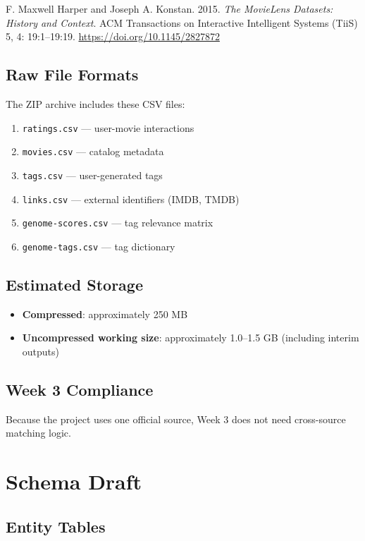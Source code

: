 \documentclass[11pt]{article}
\begin{document}
F. Maxwell Harper and Joseph A. Konstan. 2015. \emph{The MovieLens Datasets: History and Context}. ACM Transactions on Interactive Intelligent Systems (TiiS) 5, 4: 19:1--19:19. \url{https://doi.org/10.1145/2827872}

\subsection{Raw File Formats}

The ZIP archive includes these CSV files:

\begin{enumerate}[leftmargin=1.5em]
    \item \texttt{ratings.csv} --- user-movie interactions
    \item \texttt{movies.csv} --- catalog metadata
    \item \texttt{tags.csv} --- user-generated tags
    \item \texttt{links.csv} --- external identifiers (IMDB, TMDB)
    \item \texttt{genome-scores.csv} --- tag relevance matrix
    \item \texttt{genome-tags.csv} --- tag dictionary
\end{enumerate}

\subsection{Estimated Storage}

\begin{itemize}[leftmargin=1.5em]
    \item \textbf{Compressed}: approximately 250 MB
    \item \textbf{Uncompressed working size}: approximately 1.0--1.5 GB (including interim outputs)
\end{itemize}

\subsection{Week 3 Compliance}

Because the project uses one official source, Week 3 does not need cross-source matching logic.

\section{Schema Draft}

\subsection{Entity Tables}
\end{document}
